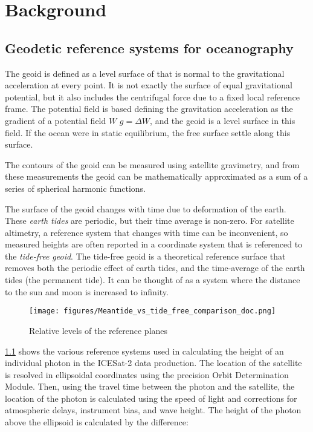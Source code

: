 \chapter{Background}


\section{Geodetic reference systems for oceanography}

The geoid is defined as a level surface of that is normal to the gravitational acceleration at every point. It is not exactly the surface of equal gravitational potential, but it also includes the centrifugal force due to a fixed local reference frame. The potential field is based defining the gravitation acceleration as the gradient of a potential field $W$ $g=\Delta W$, and the geoid is a level surface in this field. If the ocean were in static equilibrium, the free surface settle along this surface.

The contours of the geoid can be measured using satellite gravimetry, and from these measurements the geoid can be mathematically approximated as a sum of a series of spherical harmonic functions.

The surface of the geoid changes with time due to deformation of the earth. These \emph{earth tides} are periodic, but their time average is non-zero. For satellite altimetry, a reference system that changes with time can be inconvenient, so measured heights are often reported in a coordinate system that is referenced to the \emph{tide-free geoid}. The tide-free geoid is a theoretical reference surface that removes both the periodic effect of earth tides, and the time-average of the earth tides (the permanent tide). It can be thought of as a system where the distance to the sun and moon is increased to infinity.

\begin{figure}[h]
      \centering
      \texttt{[image: figures/Meantide\_vs\_tide\_free\_comparison\_doc.png]}
      \caption{Relative levels of the reference planes}
      \label{fig:geoids-ellipsoids-graphics}
\end{figure}

\ref{fig:geoids-ellipsoids-graphics} shows the various reference systems used in calculating the height of an individual photon in the ICESat-2 data production. The location of the satellite is resolved in ellipsoidal coordinates using the precision Orbit Determination Module. Then, using the travel time between the photon and the satellite, the location of the photon is calculated using the speed of light and corrections for atmospheric delays, instrument bias, and wave height. The height of the photon above the ellipsoid is calculated by the difference:


